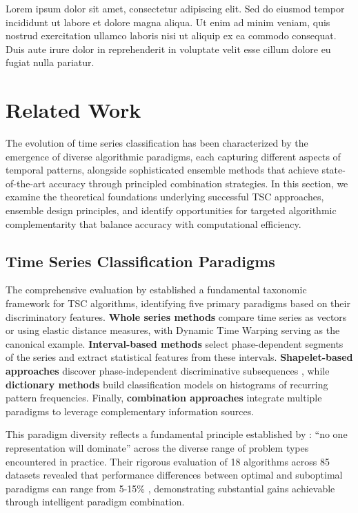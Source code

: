 \documentclass[pdflatex,sn-basic]{sn-jnl}           %
\theoremstyle{thmstyleone}%
\theoremstyle{thmstyletwo}%
\theoremstyle{thmstylethree}%
\begin{document}
Lorem ipsum dolor sit amet, consectetur adipiscing elit. Sed do eiusmod tempor incididunt ut labore et dolore magna aliqua. Ut enim ad minim veniam, quis nostrud exercitation ullamco laboris nisi ut aliquip ex ea commodo consequat. Duis aute irure dolor in reprehenderit in voluptate velit esse cillum dolore eu fugiat nulla pariatur.

\section{Related Work}\label{sec2}

The evolution of time series classification has been characterized by the emergence of diverse algorithmic paradigms, each capturing different aspects of temporal patterns, alongside sophisticated ensemble methods that achieve state-of-the-art accuracy through principled combination strategies. In this section, we examine the theoretical foundations underlying successful TSC approaches, ensemble design principles, and identify opportunities for targeted algorithmic complementarity that balance accuracy with computational efficiency.

\subsection{Time Series Classification Paradigms}

The comprehensive evaluation by \citet[p.~610]{tsc-bakeoff} established a fundamental taxonomic framework for TSC algorithms, identifying five primary paradigms based on their discriminatory features. \textbf{Whole series methods} compare time series as vectors or using elastic distance measures, with Dynamic Time Warping serving as the canonical example. \textbf{Interval-based methods} select phase-dependent segments of the series and extract statistical features from these intervals. \textbf{Shapelet-based approaches} discover phase-independent discriminative subsequences \citep{time_series_shapelets}, while \textbf{dictionary methods} build classification models on histograms of recurring pattern frequencies. Finally, \textbf{combination approaches} integrate multiple paradigms to leverage complementary information sources.

This paradigm diversity reflects a fundamental principle established by \citet[p.~637]{tsc-bakeoff}: ``no one representation will dominate'' across the diverse range of problem types encountered in practice. Their rigorous evaluation of 18 algorithms across 85 datasets revealed that performance differences between optimal and suboptimal paradigms can range from 5-15\% \citep[p.~647, Table~11]{tsc-bakeoff}, demonstrating substantial gains achievable through intelligent paradigm combination.
\end{document}
